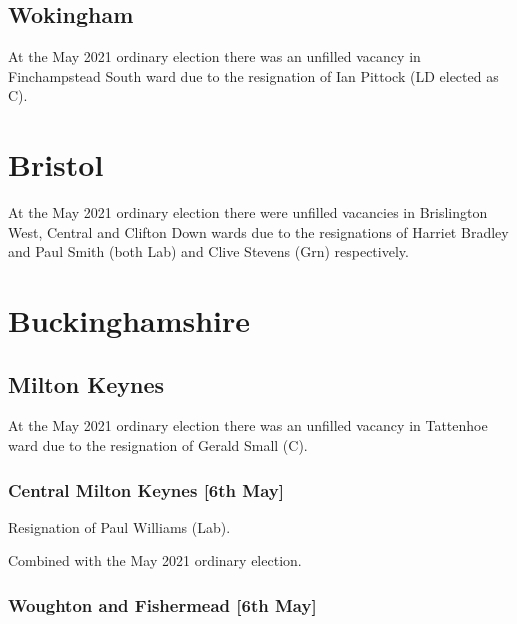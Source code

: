 \documentclass[a4paper,openany]{book}
\begin{document}
\begin{resultsiii}
\subsection*{Wokingham}

At the May 2021 ordinary election there was an unfilled vacancy in Finchampstead South ward due to the resignation of Ian Pittock (LD elected as C).

\section{Bristol}

At the May 2021 ordinary election there were unfilled vacancies in Brislington West, Central and Clifton Down wards due to the resignations of Harriet Bradley and Paul Smith (both Lab) and Clive Stevens (Grn) respectively.

\section{Buckinghamshire}

\subsection*{Milton Keynes}

At the May 2021 ordinary election there was an unfilled vacancy in Tattenhoe ward due to the resignation of Gerald Small (C).

\subsubsection*{Central Milton Keynes \hspace*{\fill}\nolinebreak[1]%
	\enspace\hspace*{\fill}
	[6th May]}


Resignation of Paul Williams (Lab).

Combined with the May 2021 ordinary election.

\subsubsection*{Woughton and Fishermead \hspace*{\fill}\nolinebreak[1]%
	\enspace\hspace*{\fill}
	[6th May]}


\end{resultsiii}
\end{document}
